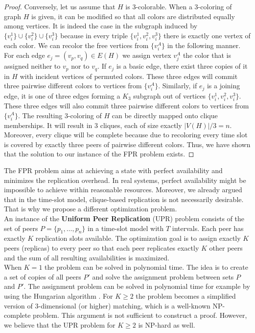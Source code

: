 \documentclass{pracamgren}
\begin{document}
\begin{proof}
Conversely, let us assume that $H$ is 3-colorable. When a 3-coloring of graph $H$ is given, it can be modified so that all colors are distributed equally among vertices. It is indeed the case in the subgraph induced by $\{v^1_i\} \cup \{v^2_i\} \cup \{v^3_i\}$ because in every triple $\{v^1_i, v^2_i, v^3_i\}$ there is exactly one vertex of each color. We can recolor the free vertices from $\{v^A_i\}$ in the following manner. For each edge $e_j=(v_p,v_q)\in E(H)$ we assign vertex $v^A_j$ the color that is assigned neither to $v_p$ nor to $v_q$. If $e_j$ is a basic edge, there exist three copies of it in $H$ with incident vertices of permuted colors. These three edges will commit three pairwise different colors to vertices from $\{v^A_i\}$. Similarly, if $e_j$ is a joining edge, it is one of three edges forming a $K_3$ subgraph out of vertices $\{v^1_i, v^2_i, v^3_i\}$. These three edges will also commit three pairwise different colors to vertices from $\{v^A_i\}$.
The resulting 3-coloring of $H$ can be directly mapped onto clique memberships. It will result in 3 cliques, each of size exactly $|V(H)| / 3 = n$. Moreover, every clique will be complete because due to recoloring every time slot is covered by exactly three peers of pairwise different colors. Thus, we have shown that the solution to our instance of the FPR problem exists.
\end{proof}

The FPR problem aims at achieving a state with perfect availability and minimizes the replication overhead. In real systems, perfect availability might be impossible to achieve within reasonable resources. Moreover, we already argued that in the time-slot model, clique-based replication is not necessarily desirable. That is why we propose a different optimization problem.\\

An instance of the {\bf Uniform Peer Replication} (UPR) problem consists of the set of peers $P=\{p_1,\ldots,p_n\}$ in a time-slot model with $T$ intervals. Each peer has exactly $K$ replication slots available. The optimization goal is to assign exactly $K$ peers (replicas) to every peer so that each peer replicates exactly $K$ other peers and the sum of all resulting availabilities is maximized.\\

When $K=1$ the problem can be solved in polynomial time. The idea is to create a set of copies of all peers $P'$ and solve the assignment problem between sets $P$ and $P'$. The assignment problem can be solved in polynomial time for example by using the Hungarian algorithm \cite{assignment}. For $K\geqslant2$ the problem becomes a simplified version of 3-dimensional (or higher) matching, which is a well-known NP-complete problem. This argument is not sufficient to construct a proof. However, we believe that the UPR problem for $K\geqslant2$ is NP-hard as well.\\
\end{document}
